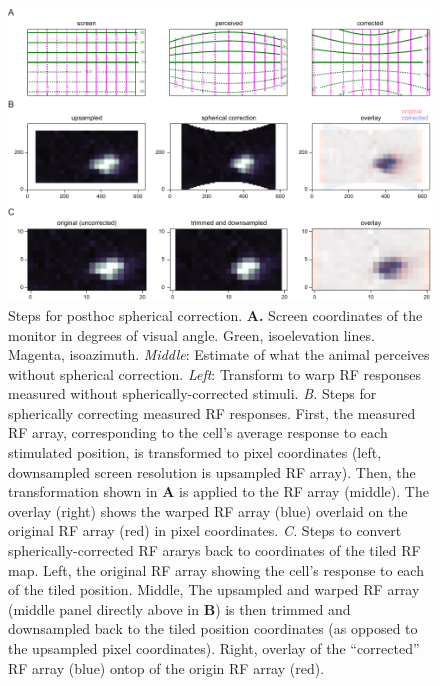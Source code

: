 \begin{figure}[t!]
\includegraphics[width=\textwidth]{figures/supplemental/fig_s7_spherical_correction_steps/fig_s7_spherical_correction_steps.pdf}
    \vspace{.1in}
    \caption[Spherical correction]{Steps for posthoc spherical correction.
    \textbf{A.} Screen coordinates of the monitor in degrees of visual angle. Green, isoelevation lines. Magenta, isoazimuth. \textit{Middle}: Estimate of what the animal perceives without spherical correction. \textit{Left}: Transform to warp RF responses measured without spherically-corrected stimuli. 
    \textit{B.} Steps for spherically correcting measured RF responses. First, the measured RF array, corresponding to the cell's average response to each stimulated position, is transformed to pixel coordinates (left, downsampled screen resolution is upsampled RF array). Then, the transformation shown in \textbf{A} is applied to the RF array (middle). The overlay (right) shows the warped RF array (blue) overlaid on the original RF array (red) in pixel coordinates.
    \textit{C.} Steps to convert spherically-corrected RF ararys back to coordinates of the tiled RF map. Left, the original RF array showing the cell's response to each of the tiled position. Middle, The upsampled and warped RF array (middle panel directly above in \textbf{B}) is then trimmed and downsampled back to the tiled position coordinates (as opposed to the upsampled pixel coordinates). Right, overlay of the ``corrected'' RF array (blue) ontop of the origin RF array (red).
    \label{supfig:spherical_correction_steps}}
\end{figure}

